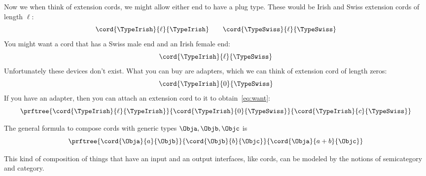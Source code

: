 Now we when think of extension cords, we might allow either end to have a plug type.
%
These would be Irish and Swiss extension cords of length $\ell$:
%
\begin{equation}
    \cord{\TypeIrish}{\ell}{\TypeIrish} \qquad \cord{\TypeSwiss}{\ell}{\TypeSwiss}
\end{equation}
%
You might want a cord that has a Swiss male end and an Irish female end:
%
\begin{equation}
    \label{eq:want}
    \cord{\TypeIrish}{\ell}{\TypeSwiss}
\end{equation}
%
Unfortunately these devices don't exist.
What you can buy are adapters, which we can think of extension cord of length zeros:
\begin{equation}
    \cord{\TypeIrish}{0}{\TypeSwiss}
\end{equation}
%
If you have an adapter, then you can attach an extension cord to it to obtain~\cref{eq:want}:
%
\begin{equation}
    \label{eq:irish-swiss-result}
    \prftree{\cord{\TypeIrish}{\ell}{\TypeIrish}}{\cord{\TypeIrish}{0}{\TypeSwiss}}{\cord{\TypeIrish}{c}{\TypeSwiss}}
\end{equation}

The general formula to compose cords with generic types $\Obja, \Objb, \Objc$ is
\begin{equation}
    \label{eq:cords-generic}
    \prftree{\cord{\Obja}{a}{\Objb}}{\cord{\Objb}{b}{\Objc}}{\cord{\Obja}{a+b}{\Objc}}
\end{equation}

This kind of composition of things that have an input and an output interfaces, like cords, can be modeled by the notions of semicategory and category.


%

%
%
%


